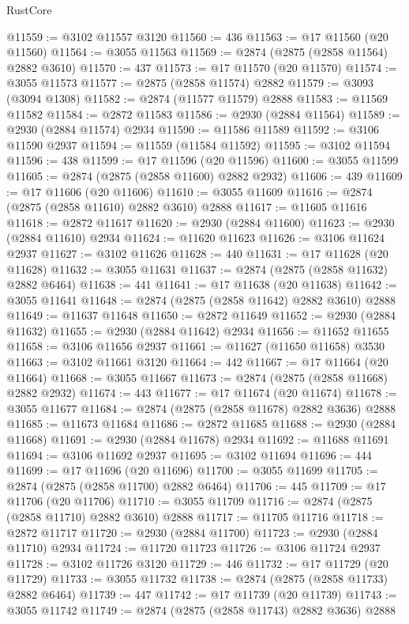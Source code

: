 \begin{lexlean}{RustCore}
\begin{coremodule}
@11559 := @3102 @11557 @3120
@11560 := 436
@11563 := @17 @11560 (@20 @11560)
@11564 := @3055 @11563
@11569 := @2874 (@2875 (@2858 @11564) @2882 @3610)
@11570 := 437
@11573 := @17 @11570 (@20 @11570)
@11574 := @3055 @11573
@11577 := @2875 (@2858 @11574) @2882
@11579 := @3093 (@3094 @1308)
@11582 := @2874 (@11577 @11579) @2888
@11583 := @11569 @11582
@11584 := @2872 @11583
@11586 := @2930 (@2884 @11564)
@11589 := @2930 (@2884 @11574) @2934
@11590 := @11586 @11589
@11592 := @3106 @11590 @2937
@11594 := @11559 (@11584 @11592)
@11595 := @3102 @11594
@11596 := 438
@11599 := @17 @11596 (@20 @11596)
@11600 := @3055 @11599
@11605 := @2874 (@2875 (@2858 @11600) @2882 @2932)
@11606 := 439
@11609 := @17 @11606 (@20 @11606)
@11610 := @3055 @11609
@11616 := @2874 (@2875 (@2858 @11610) @2882 @3610) @2888
@11617 := @11605 @11616
@11618 := @2872 @11617
@11620 := @2930 (@2884 @11600)
@11623 := @2930 (@2884 @11610) @2934
@11624 := @11620 @11623
@11626 := @3106 @11624 @2937
@11627 := @3102 @11626
@11628 := 440
@11631 := @17 @11628 (@20 @11628)
@11632 := @3055 @11631
@11637 := @2874 (@2875 (@2858 @11632) @2882 @6464)
@11638 := 441
@11641 := @17 @11638 (@20 @11638)
@11642 := @3055 @11641
@11648 := @2874 (@2875 (@2858 @11642) @2882 @3610) @2888
@11649 := @11637 @11648
@11650 := @2872 @11649
@11652 := @2930 (@2884 @11632)
@11655 := @2930 (@2884 @11642) @2934
@11656 := @11652 @11655
@11658 := @3106 @11656 @2937
@11661 := @11627 (@11650 @11658) @3530
@11663 := @3102 @11661 @3120
@11664 := 442
@11667 := @17 @11664 (@20 @11664)
@11668 := @3055 @11667
@11673 := @2874 (@2875 (@2858 @11668) @2882 @2932)
@11674 := 443
@11677 := @17 @11674 (@20 @11674)
@11678 := @3055 @11677
@11684 := @2874 (@2875 (@2858 @11678) @2882 @3636) @2888
@11685 := @11673 @11684
@11686 := @2872 @11685
@11688 := @2930 (@2884 @11668)
@11691 := @2930 (@2884 @11678) @2934
@11692 := @11688 @11691
@11694 := @3106 @11692 @2937
@11695 := @3102 @11694
@11696 := 444
@11699 := @17 @11696 (@20 @11696)
@11700 := @3055 @11699
@11705 := @2874 (@2875 (@2858 @11700) @2882 @6464)
@11706 := 445
@11709 := @17 @11706 (@20 @11706)
@11710 := @3055 @11709
@11716 := @2874 (@2875 (@2858 @11710) @2882 @3610) @2888
@11717 := @11705 @11716
@11718 := @2872 @11717
@11720 := @2930 (@2884 @11700)
@11723 := @2930 (@2884 @11710) @2934
@11724 := @11720 @11723
@11726 := @3106 @11724 @2937
@11728 := @3102 @11726 @3120
@11729 := 446
@11732 := @17 @11729 (@20 @11729)
@11733 := @3055 @11732
@11738 := @2874 (@2875 (@2858 @11733) @2882 @6464)
@11739 := 447
@11742 := @17 @11739 (@20 @11739)
@11743 := @3055 @11742
@11749 := @2874 (@2875 (@2858 @11743) @2882 @3636) @2888

\end{coremodule}
\end{lexlean}
